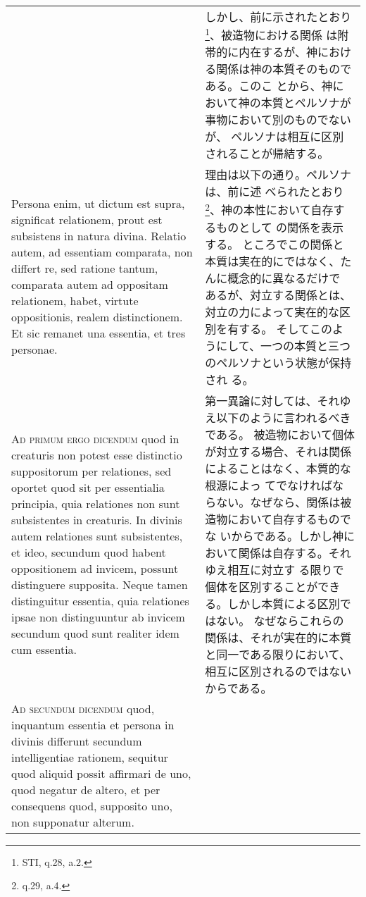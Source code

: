 \documentclass[10pt]{jsarticle} %
\begin{document}
\begin{longtable}{p{21em}p{21em}}
&

しかし、前に示されたとおり\footnote{STI, q.28, a.2.}、被造物における関係
 は附帯的に内在するが、神における関係は神の本質そのものである。このこ
 とから、神において神の本質とペルソナが事物において別のものでないが、
 ペルソナは相互に区別されることが帰結する。

\\

Persona enim, ut dictum est supra, significat relationem,
prout est subsistens in natura divina. Relatio autem, ad essentiam
comparata, non differt re, sed ratione tantum, comparata autem ad
oppositam relationem, habet, virtute oppositionis, realem
distinctionem. Et sic remanet una essentia, et tres personae.

&

理由は以下の通り。ペルソナは、前に述
 べられたとおり\footnote{q.29, a.4.}、神の本性において自存するものとして
 の関係を表示する。
ところでこの関係と本質は実在的にではなく、たんに概念的に異なるだけで
 あるが、対立する関係とは、対立の力によって実在的な区別を有する。
そしてこのようにして、一つの本質と三つのペルソナという状態が保持され
 る。

\\




{\scshape Ad primum ergo dicendum} quod in creaturis non potest esse distinctio
suppositorum per relationes, sed oportet quod sit per essentialia
principia, quia relationes non sunt subsistentes in creaturis. In
divinis autem relationes sunt subsistentes, et ideo, secundum quod
habent oppositionem ad invicem, possunt distinguere supposita. Neque
tamen distinguitur essentia, quia relationes ipsae non distinguuntur ab
invicem secundum quod sunt realiter idem cum essentia.


&

第一異論に対しては、それゆえ以下のように言われるべきである。
被造物において個体が対立する場合、それは関係によることはなく、本質的な根源によっ
 てでなければならない。なぜなら、関係は被造物において自存するものでな
 いからである。しかし神において関係は自存する。それゆえ相互に対立す
 る限りで個体を区別することができる。しかし本質による区別ではない。
 なぜならこれらの関係は、それが実在的に本質と同一である限りにおいて、
 相互に区別されるのではないからである。


\\



{\scshape Ad secundum dicendum} quod, inquantum essentia et persona in divinis
differunt secundum intelligentiae rationem, sequitur quod aliquid possit
affirmari de uno, quod negatur de altero, et per consequens quod,
supposito uno, non supponatur alterum.



\end{longtable}
\end{document}
